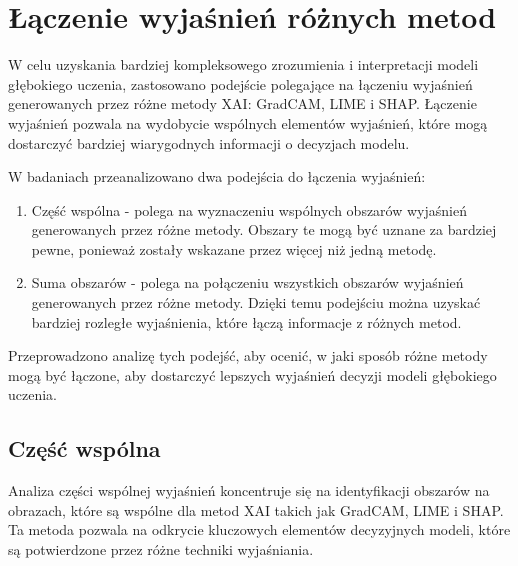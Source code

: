 \section*{Łączenie wyjaśnień różnych metod}

W celu uzyskania bardziej kompleksowego zrozumienia i interpretacji modeli głębokiego uczenia, zastosowano podejście polegające na łączeniu wyjaśnień generowanych przez różne metody XAI: GradCAM, LIME i SHAP.
Łączenie wyjaśnień pozwala na wydobycie wspólnych elementów wyjaśnień, które mogą dostarczyć bardziej wiarygodnych informacji o decyzjach modelu.

W badaniach przeanalizowano dwa podejścia do łączenia wyjaśnień:
\begin{enumerate}
	\item Część wspólna - polega na wyznaczeniu wspólnych obszarów wyjaśnień generowanych przez różne metody.
	      Obszary te mogą być uznane za  bardziej pewne, ponieważ zostały wskazane przez więcej niż jedną metodę.
	\item Suma obszarów - polega na połączeniu wszystkich obszarów wyjaśnień generowanych przez różne metody.
	      Dzięki temu podejściu można uzyskać bardziej rozległe wyjaśnienia, które łączą informacje z różnych metod.
\end{enumerate}

Przeprowadzono analizę tych podejść, aby ocenić, w jaki sposób różne metody mogą być łączone, aby dostarczyć lepszych wyjaśnień decyzji modeli głębokiego uczenia.

\subsection*{Część wspólna}
Analiza części wspólnej wyjaśnień koncentruje się na identyfikacji obszarów na obrazach, które są wspólne dla metod XAI takich jak GradCAM, LIME i SHAP.
Ta metoda pozwala na odkrycie kluczowych elementów decyzyjnych modeli, które są potwierdzone przez różne techniki wyjaśniania.

